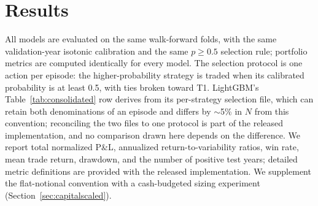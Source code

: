 \documentclass[sigconf,review,anonymous]{acmart}
\begin{document}
\section{Results}
\label{sec:results}

All models are evaluated on the same walk-forward folds, with the same validation-year isotonic calibration and the same $p\ge0.5$ selection rule; portfolio metrics are computed identically for every model. The selection protocol is one action per episode: the higher-probability strategy is traded when its calibrated probability is at least 0.5, with ties broken toward T1. LightGBM's Table~\ref{tab:consolidated} row derives from its per-strategy selection file, which can retain both denominations of an episode and differs by $\sim$5\% in $N$ from this convention; reconciling the two files to one protocol is part of the released implementation, and no comparison drawn here depends on the difference. We report total normalized P\&L, annualized return-to-variability ratios, win rate, mean trade return, drawdown, and the number of positive test years; detailed metric definitions are provided with the released implementation. We supplement the flat-notional convention with a cash-budgeted sizing experiment (Section~\ref{sec:capitalscaled}).
\end{document}
